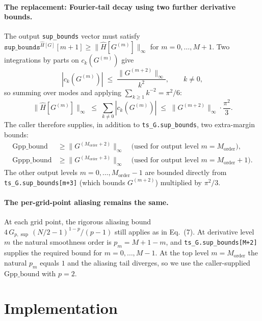 \documentclass[11pt]{article}
\theoremstyle{definition}
\begin{document}
\paragraph{The replacement: Fourier-tail decay using two further derivative bounds.}
The output \texttt{sup\_bounds} vector must satisfy
$\texttt{sup\_bounds}^{\hat H[G]}[m{+}1] \ge \|\hat H[G^{(m)}]\|_\infty$
for $m = 0,\ldots,M{+}1$.  Two integrations by parts on $c_k(G^{(m)})$ give
\[
  |c_k(G^{(m)})| \;\le\; \frac{\|G^{(m+2)}\|_\infty}{k^2},
  \qquad k \neq 0,
\]
so summing over modes and applying $\sum_{k \ge 1} k^{-2} = \pi^2/6$:
\begin{equation}\label{eq:supbounds_HG}
  \|\hat H[G^{(m)}]\|_\infty \;\le\; \sum_{k \neq 0} |c_k(G^{(m)})|
    \;\le\; \|G^{(m+2)}\|_\infty \cdot \frac{\pi^2}{3}.
\end{equation}
The caller therefore supplies, in addition to \texttt{ts\_G.sup\_bounds},
two extra-margin bounds:
\begin{align*}
  \mathrm{Gpp\_bound}  &\ge \|G^{(M_{\mathrm{order}}+2)}\|_\infty
                       \quad\text{(used for output level $m = M_{\mathrm{order}}$)},\\
  \mathrm{Gppp\_bound} &\ge \|G^{(M_{\mathrm{order}}+3)}\|_\infty
                       \quad\text{(used for output level $m = M_{\mathrm{order}}+1$)}.
\end{align*}
The other output levels $m = 0,\ldots,M_{\mathrm{order}}-1$ are bounded directly
from \texttt{ts\_G.sup\_bounds[m+3]} (which bounds $G^{(m+2)}$) multiplied by $\pi^2/3$.

\paragraph{The per-grid-point aliasing remains the same.}
At each grid point, the rigorous aliasing bound $4\,G_{p,\sup}\,(N/2-1)^{1-p}/(p-1)$
still applies as in Eq.~(7).  At derivative level $m$ the natural smoothness
order is $p_m = M+1-m$, and \texttt{ts\_G.sup\_bounds[M+2]} supplies the
required bound for $m = 0,\ldots,M-1$.  At the top level $m = M_{\mathrm{order}}$
the natural $p_m$ equals $1$ and the aliasing tail diverges, so we use the
caller-supplied $\mathrm{Gpp\_bound}$ with $p = 2$.

\section{Implementation}
\end{document}
